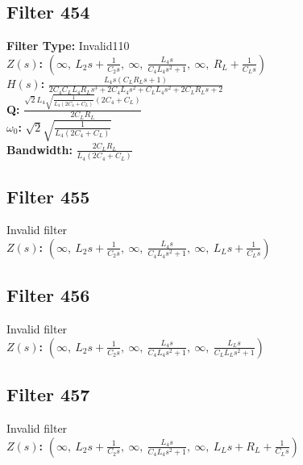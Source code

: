 \documentclass{article}
\begin{document}
\subsection*{Filter 454}
\textbf{Filter Type:} Invalid110 \\ 
\textbf{$Z(s)$:} $\left( \infty, \  L_{2} s + \frac{1}{C_{2} s}, \  \infty, \  \frac{L_{4} s}{C_{4} L_{4} s^{2} + 1}, \  \infty, \  R_{L} + \frac{1}{C_{L} s}\right)$ \\ 
\textbf{$H(s)$:} $\frac{L_{4} s \left(C_{L} R_{L} s + 1\right)}{2 C_{4} C_{L} L_{4} R_{L} s^{3} + 2 C_{4} L_{4} s^{2} + C_{L} L_{4} s^{2} + 2 C_{L} R_{L} s + 2}$ \\ 
\textbf{Q:} $\frac{\sqrt{2} L_{4} \sqrt{\frac{1}{L_{4} \left(2 C_{4} + C_{L}\right)}} \left(2 C_{4} + C_{L}\right)}{2 C_{L} R_{L}}$ \\ 
\textbf{$\omega_0$:} $\sqrt{2} \sqrt{\frac{1}{L_{4} \left(2 C_{4} + C_{L}\right)}}$ \\ 
\textbf{Bandwidth:} $\frac{2 C_{L} R_{L}}{L_{4} \left(2 C_{4} + C_{L}\right)}$ \\ 
\subsection*{Filter 455}
Invalid filter \\ 
\textbf{$Z(s)$:} $\left( \infty, \  L_{2} s + \frac{1}{C_{2} s}, \  \infty, \  \frac{L_{4} s}{C_{4} L_{4} s^{2} + 1}, \  \infty, \  L_{L} s + \frac{1}{C_{L} s}\right)$ \\ 
\subsection*{Filter 456}
Invalid filter \\ 
\textbf{$Z(s)$:} $\left( \infty, \  L_{2} s + \frac{1}{C_{2} s}, \  \infty, \  \frac{L_{4} s}{C_{4} L_{4} s^{2} + 1}, \  \infty, \  \frac{L_{L} s}{C_{L} L_{L} s^{2} + 1}\right)$ \\ 
\subsection*{Filter 457}
Invalid filter \\ 
\textbf{$Z(s)$:} $\left( \infty, \  L_{2} s + \frac{1}{C_{2} s}, \  \infty, \  \frac{L_{4} s}{C_{4} L_{4} s^{2} + 1}, \  \infty, \  L_{L} s + R_{L} + \frac{1}{C_{L} s}\right)$ \\ 
\end{document}
